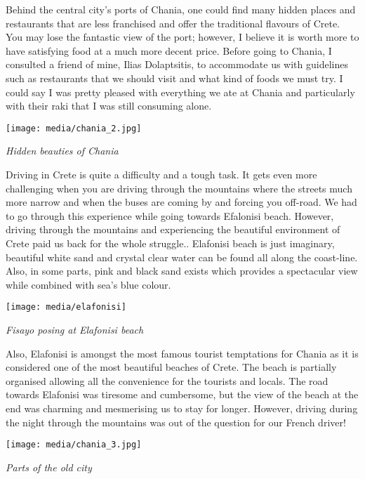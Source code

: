 \documentclass[10pt,a4paper]{article} %
\begin{document}
\begin{multicols}{3}
Behind the central city's ports of Chania,
one could find many hidden places and restaurants that are less franchised
and offer the traditional flavours of Crete. 
You may lose the fantastic view of the port;
however, I believe it is worth more to have satisfying food
at a much more decent price. 
Before going to Chania, I consulted a friend of mine, Ilias Dolaptsitis, 
to accommodate us with guidelines such as restaurants that we should visit
and what kind of foods we must try. 
I could say I was pretty pleased with everything we ate at Chania
and particularly with their raki that I was still consuming alone. 

\begin{center}
	\texttt{[image: media/chania\_2.jpg]}
	\par\textit{Hidden beauties of Chania}
\end{center}

Driving in Crete is quite a difficulty and a tough task. 
It gets even more challenging when you are driving through the mountains
where the streets much more narrow and when the buses are coming by and forcing you off-road. 
We had to go through this experience while going towards Efalonisi beach. 
However, driving through the mountains and experiencing the beautiful environment
of Crete paid us back for the whole struggle..
Elafonisi beach is just imaginary, beautiful white sand
and crystal clear water can be found all along the coast-line. 
Also, in some parts, pink and black sand exists which provides a spectacular view
while combined with sea's blue colour.

\begin{center}
	\texttt{[image: media/elafonisi]}
	\par\textit{Fisayo posing at Elafonisi beach}
\end{center}

Also, Elafonisi is amongst the most famous tourist temptations for Chania
as it is considered one of the most beautiful beaches of Crete. 
The beach is partially organised allowing all the convenience for the tourists
and locals. 
The road towards Elafonisi was tiresome and cumbersome,
but the view of the beach at the end was charming and mesmerising us to stay for longer. 
However, driving during the night through the mountains was out of the question
for our French driver!

\begin{center}
	\texttt{[image: media/chania\_3.jpg]}
	\par\textit{Parts of the old city}
\end{center}


\end{multicols}
\end{document}
